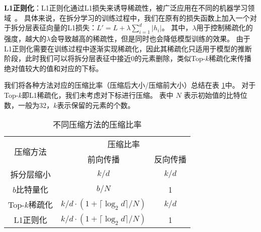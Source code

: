 \textbf{L1正则化}：L1正则化通过L1损失来诱导稀疏性，被广泛应用在不同的机器学习领域~\cite{tibshirani1996lasso,wright2008sparse_face,yin2012kernel,hoefler2021sparse_deeplearning}。
%
具体来说，在拆分学习的训练过程中，我们在原有的损失函数上加入一个对于拆分层表征向量的L1损失：$L' = L + \lambda \sum_{i=1}^d |h_i|$。
%
其中，$\lambda$用于控制稀疏化的强度，越大的$\lambda$会导致越高的稀疏性，但是同时也会降低模型训练的效果。
%
由于L1正则化需要在训练过程中逐渐实现稀疏化，因此其稀疏化只适用于模型的推断阶段，此时我们可以将拆分层表征中接近0的元素删除，类似Top-$k$稀疏化来传播绝对值较大的值和对应的下标。
%


我们将各种方法对应的压缩比率（压缩后大小/压缩前大小）总结在表 \ref{tab:randomized_top-k:compression_ratio}中。
%
对于Top-$k$即L1稀疏化，我们未考虑对下标进行压缩。
%
表中 $N$ 表示初始值的比特位数，一般为32，$k$表示保留的元素的个数。

\begin{table}[h]
    \centering
    \begin{tabular}{ccc}
    \toprule
    \multirow{2}{*}{压缩方法} & \multicolumn{2}{c}{压缩比率} \\ 
    \cmidrule(lr){2-3}
            & 前向传播 & 反向传播 \\ \midrule
    拆分层缩小     & $k/d$       & $k/d$ \\
    $b$比特量化    & $b/N$    & 1 \\
    Top-$k$稀疏化  & $k/d\cdot (1 + \lceil \log_2 d \rceil/N)$ & $k/d$ \\
    L1正则化       & $k/d\cdot (1 + \lceil \log_2 d \rceil/N)$ & 1 \\
    \bottomrule
    \end{tabular}
    \caption{不同压缩方法的压缩比率}
    \label{tab:randomized_top-k:compression_ratio}
\end{table}